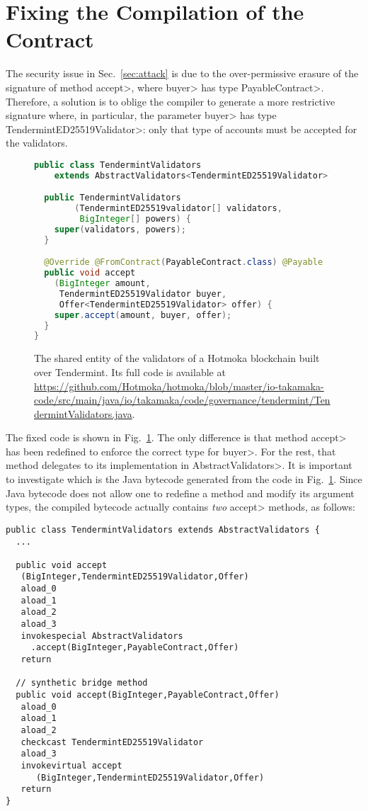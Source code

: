 \section{Fixing the Compilation of the Contract} \label{sec:fix}

The security issue in Sec.~\ref{sec:attack} is due to the
over-permissive erasure of the signature of method \<accept>,
where \<buyer> has type \<PayableContract>.
Therefore, a solution is to oblige the compiler to generate a more
restrictive signature where, in particular, the parameter \<buyer>
has type \<TendermintED25519Validator>: only that type of accounts
must be accepted for the validators.

\begin{figure}[t]
  \begin{center}
    \begin{lstlisting}[language=Java]
public class TendermintValidators
    extends AbstractValidators<TendermintED25519Validator> {

  public TendermintValidators
        (TendermintED25519validator[] validators, 
         BigInteger[] powers) {
    super(validators, powers);
  }

  @Override @FromContract(PayableContract.class) @Payable
  public void accept
    (BigInteger amount, 
     TendermintED25519Validator buyer, 
     Offer<TendermintED25519Validator> offer) {
    super.accept(amount, buyer, offer);
  }
}
    \end{lstlisting}
  \end{center}
  \caption{The shared entity of the validators of a Hotmoka blockchain built over Tendermint.
  Its full code is available at \url{https://github.com/Hotmoka/hotmoka/blob/master/io-takamaka-code/src/main/java/io/takamaka/code/governance/tendermint/TendermintValidators.java}.}\label{fig:solution}
\end{figure}

The fixed code is shown in Fig.~\ref{fig:solution}. The only difference is that method
\<accept> has been redefined to enforce the correct type for \<buyer>. For the rest, that method
delegates to its implementation in \<AbstractValidators>.
It is important to investigate which is the Java bytecode generated from
the code in Fig.~\ref{fig:solution}. Since Java bytecode does not allow one to redefine a method
and modify its argument types, the compiled bytecode actually contains \emph{two}
\<accept> methods, as follows:

\begin{lstlisting}[language=JavaBytecode]
public class TendermintValidators extends AbstractValidators {
  ...
  
  public void accept
   (BigInteger,TendermintED25519Validator,Offer)
   aload_0
   aload_1
   aload_2
   aload_3
   invokespecial AbstractValidators
     .accept(BigInteger,PayableContract,Offer)
   return

  // synthetic bridge method
  public void accept(BigInteger,PayableContract,Offer)
   aload_0
   aload_1
   aload_2
   checkcast TendermintED25519Validator
   aload_3
   invokevirtual accept
      (BigInteger,TendermintED25519Validator,Offer)
   return
}
\end{lstlisting}

